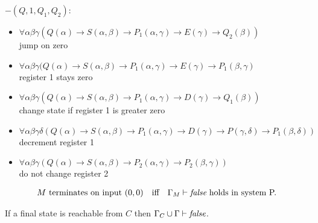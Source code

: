$-(Q,1,Q_1,Q_2):$
\begin{itemize}
\item $\forall\alpha\beta\gamma(Q(\alpha)\to S(\alpha,\beta)\to P_1(\alpha,\gamma)\to E(\gamma)\to Q_2(\beta))$\\jump on zero
\item $\forall\alpha\beta\gamma(Q(\alpha)\to S(\alpha,\beta)\to P_1(\alpha,\gamma)\to E(\gamma)\to P_1(\beta,\gamma)$\\register 1 stays zero
\item $\forall\alpha\beta\gamma(Q(\alpha)\to S(\alpha,\beta)\to P_1(\alpha,\gamma)\to D(\gamma)\to Q_1(\beta))$\\change state if register 1 is greater zero
\item $\forall\alpha\beta\gamma\delta(Q(\alpha)\to S(\alpha,\beta)\to P_1(\alpha,\gamma)\to D(\gamma) \to P(\gamma,\delta)\to P_1(\beta,\delta))$\\decrement register 1
\item $\forall\alpha\beta\gamma(Q(\alpha)\to S(\alpha,\beta)\to P_2(\alpha,\gamma)\to P_2(\beta,\gamma))$\\do not change register 2
\end{itemize}
\begin{lemma}
\begin{align*}
&\text{$M$ terminates on input $(0,0)$}&& \text{iff} &\text{$\Gamma_M\vdash\emph{false}$ holds in system P.}
\end{align*}
\end{lemma}
\begin{claim}
If a final state is reachable from $C$ then $\Gamma_C\cup\Gamma\vdash\emph{false}$.
\end{claim}
